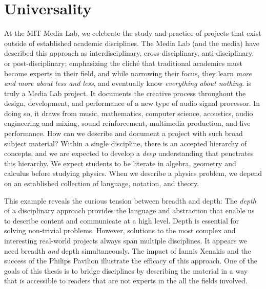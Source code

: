 \section{Universality}
\label{sec:universality}
At the MIT Media Lab, we celebrate the study and practice of projects
that exist outside of established academic disciplines. The Media Lab
(and the media) have described this approach as interdisciplinary,
cross-disciplinary, anti-disciplinary, or post-disciplinary;
emphasizing the clich\'{e} that traditional academics must become
experts in their field, and while narrowing their focus, they learn
\textit{more and more about less and less}, and eventually know
\textit{everything about nothing}.  \thesis is truly a Media Lab
project. It documents the creative process throughout the design,
development, and performance of a new type of audio signal
processor. In doing so, it draws from music, mathematics, computer
science, acoustics, audio engineering and mixing, sound reinforcement,
multimedia production, and live performance. How can we describe and
document a project with such broad subject material? Within a single
discipline, there is an accepted hierarchy of concepts, and we are
expected to develop a \emph{deep} understanding that penetrates this
hierarchy. We expect students to be literate in algebra, geometry and
calculus before studying physics. When we describe a physics problem,
we depend on an established collection of language, notation, and
theory.

This example reveals the curious tension between breadth and depth:
The \textit{depth} of a disciplinary approach provides the language
and abstraction that enable us to describe content and communicate at
a high level. Depth is essential for solving non-trivial
problems. However, solutions to the most complex and interesting
real-world projects always span multiple disciplines. It appears we
need breadth \emph{and} depth simultaneously. The impact of Iannis
Xenakis and the success of the Philips Pavilion illustrate the
efficacy of this approach. One of the goals of this thesis is to
bridge disciplines by describing the material in a way that is
accessible to readers that are not experts in the all the fields
involved.



